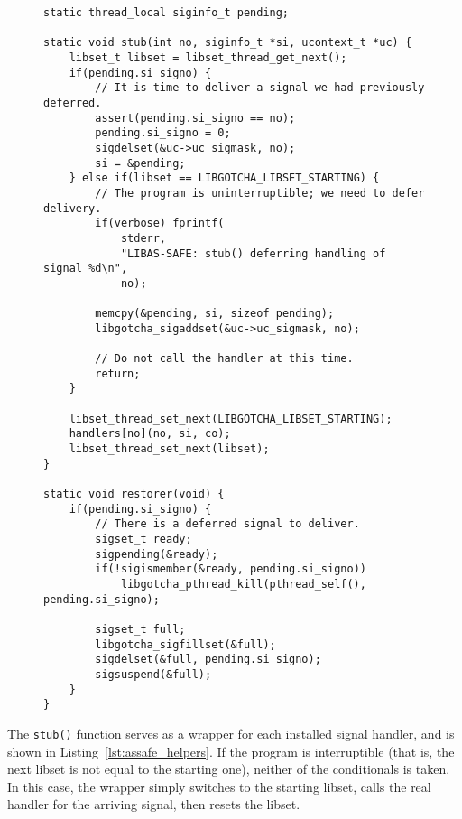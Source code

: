 \begin{figure}[p]
\begin{fullpage}
\begin{lstlisting}[label=lst:assafe_helpers,caption=\textit{libas-safe}'s signal handler wrapper and control library callback,morekeywords=thread_local]
static thread_local siginfo_t pending;

static void stub(int no, siginfo_t *si, ucontext_t *uc) {
	libset_t libset = libset_thread_get_next();
	if(pending.si_signo) {
		// It is time to deliver a signal we had previously deferred.
		assert(pending.si_signo == no);
		pending.si_signo = 0;
		sigdelset(&uc->uc_sigmask, no);
		si = &pending;
	} else if(libset == LIBGOTCHA_LIBSET_STARTING) {
		// The program is uninterruptible; we need to defer delivery.
		if(verbose) fprintf(
			stderr,
			"LIBAS-SAFE: stub() deferring handling of signal %d\n",
			no);

		memcpy(&pending, si, sizeof pending);
		libgotcha_sigaddset(&uc->uc_sigmask, no);

		// Do not call the handler at this time.
		return;
	}

	libset_thread_set_next(LIBGOTCHA_LIBSET_STARTING);
	handlers[no](no, si, co);
	libset_thread_set_next(libset);
}

static void restorer(void) {
	if(pending.si_signo) {
		// There is a deferred signal to deliver.
		sigset_t ready;
		sigpending(&ready);
		if(!sigismember(&ready, pending.si_signo))
			libgotcha_pthread_kill(pthread_self(), pending.si_signo);

		sigset_t full;
		libgotcha_sigfillset(&full);
		sigdelset(&full, pending.si_signo);
		sigsuspend(&full);
	}
}
\end{lstlisting}
\end{fullpage}
\end{figure}

The \texttt{stub()} function serves as a wrapper for each installed signal handler,
and is shown in Listing~\ref{lst:assafe_helpers}.  If the program is interruptible
(that is, the next libset is not equal to the starting one), neither of the
conditionals is taken.  In this case, the wrapper simply switches to the starting
libset, calls the real handler for the arriving signal, then resets the libset.


